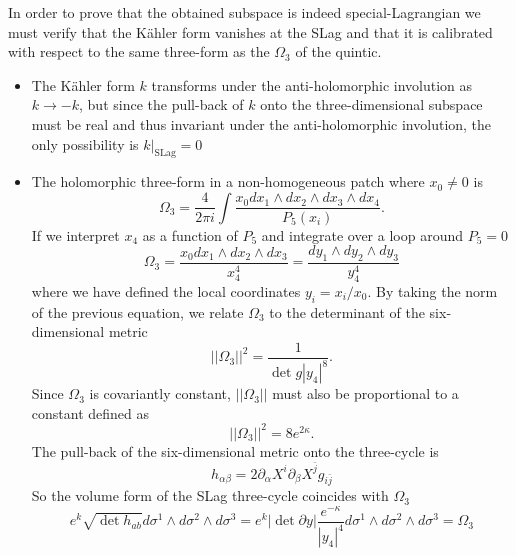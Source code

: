 In order to prove that the obtained subspace is indeed special-Lagrangian we must
verify that the Kähler form vanishes at the SLag and that it is calibrated with respect to the
same three-form as the $\Omega_3$ of the quintic.
\begin{itemize}
  \item The Kähler form $k$ transforms under the anti-holomorphic involution as $k\to -k$, 
    but since the pull-back of $k$ onto the three-dimensional subspace must be real and thus invariant under the anti-holomorphic involution, 
    the only possibility is $k\rvert_{\mathrm{SLag}}=0$

  \item 
The holomorphic three-form in a non-homogeneous patch where $x_0\neq0$ is
\begin{equation}
  \Omega_3=\frac{4}{2\pi i}\int \frac{x_0 dx_1\wedge dx_2 \wedge dx_3 \wedge dx_4}{P_5(x_i)}.
  \label{eq:3form}
\end{equation}
If we interpret $x_4$ as a function of $P_5$ and integrate over a loop around $P_5=0$
\begin{equation}
  \Omega_3=\frac{x_0 dx_1\wedge dx_2 \wedge dx_3}{x_4^4}
  =\frac{dy_1\wedge dy_2\wedge dy_3}{y_4^4}
\end{equation}
where we have defined the local coordinates $y_i=x_i/x_0$.
By taking the norm of the previous equation, we relate $\Omega_3$ to the determinant of the 
six-dimensional metric
\begin{equation}
  ||\Omega_3||^2 = \frac{1}{\det g |y_4|^8}.
\end{equation}
Since $\Omega_3$ is covariantly constant, $||\Omega_3||$ must also be proportional to a constant defined as
\begin{equation}
  ||\Omega_3||^2 = 8e^{2\kappa}.
\end{equation}
The pull-back of the six-dimensional metric onto the three-cycle is
\begin{equation}
  h_{\alpha\beta}=2\partial_\alpha X^i \partial_\beta X^{\bar j}g_{i\bar j}
\end{equation}
So the volume form of the SLag three-cycle coincides with $\Omega_3$
\begin{equation}
  e^k \sqrt{\det h_{ab}}d\sigma^1\wedge d\sigma^2\wedge d\sigma^3
  =e^k |\det \partial y| \frac{e^{-\kappa}}{|y_4|^4}d\sigma^1\wedge d\sigma^2\wedge d\sigma^3=\Omega_3
\end{equation}
\end{itemize}

